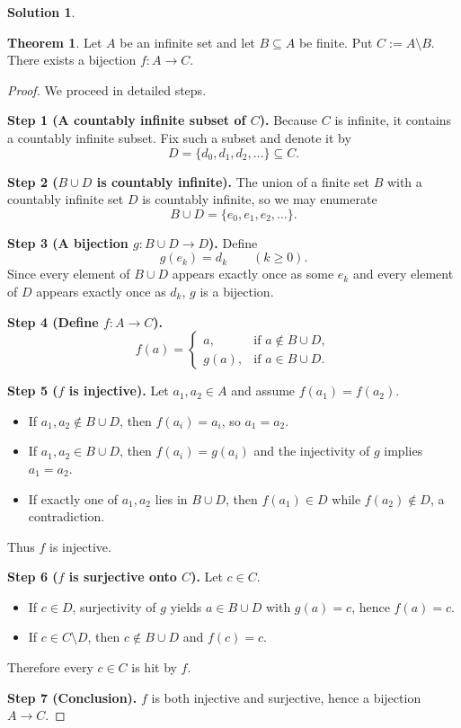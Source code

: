 \documentclass[12pt]{article}
\theoremstyle{definition} %
\newtheorem{solution}{Solution}
\newtheorem{theorem}{Theorem}
\theoremstyle{plain} %
\begin{document}
  \begin{solution}

    \begin{theorem}
      Let $A$ be an infinite set and let $B\subseteq A$ be finite.
      Put $C:=A\setminus B$.
      There exists a bijection $f\colon A\to C$.
      \end{theorem}
      
      \begin{proof}
      We proceed in detailed steps.
      
      \textbf{Step 1 (A countably infinite subset of $C$).}
      Because $C$ is infinite, it contains a countably infinite subset.
      Fix such a subset and denote it by
      \[
        D=\{d_0,d_1,d_2,\dots\}\subseteq C.
      \]
      
      \textbf{Step 2 ($B\cup D$ is countably infinite).}
      The union of a finite set $B$ with a countably infinite set $D$ is
      countably infinite, so we may enumerate
      \[
        B\cup D=\{e_0,e_1,e_2,\dots\}.
      \]
      
      \textbf{Step 3 (A bijection $g\colon B\cup D\to D$).}
      Define
      \[
        g(e_k)=d_k\qquad(k\ge 0).
      \]
      Since every element of $B\cup D$ appears exactly once as some $e_k$
      and every element of $D$ appears exactly once as $d_k$,
      $g$ is a bijection.
      
      \textbf{Step 4 (Define $f\colon A\to C$).}
      \[
        f(a)=
        \begin{cases}
          a,   &\text{if }a\notin B\cup D,\\[6pt]
          g(a),&\text{if }a\in B\cup D.
        \end{cases}
      \]
      
      \textbf{Step 5 ($f$ is injective).}
      Let $a_1,a_2\in A$ and assume $f(a_1)=f(a_2)$.
      \begin{itemize}
        \item If $a_1,a_2\notin B\cup D$, then $f(a_i)=a_i$, so $a_1=a_2$.
        \item If $a_1,a_2\in B\cup D$, then $f(a_i)=g(a_i)$ and the injectivity of $g$
              implies $a_1=a_2$.
        \item If exactly one of $a_1,a_2$ lies in $B\cup D$, then
              $f(a_1)\in D$ while $f(a_2)\notin D$, a contradiction.
      \end{itemize}
      Thus $f$ is injective.
      
      \textbf{Step 6 ($f$ is surjective onto $C$).}
      Let $c\in C$.
      \begin{itemize}
        \item If $c\in D$, surjectivity of $g$ yields $a\in B\cup D$ with $g(a)=c$,
              hence $f(a)=c$.
        \item If $c\in C\setminus D$, then $c\notin B\cup D$ and $f(c)=c$.
      \end{itemize}
      Therefore every $c\in C$ is hit by $f$.
      
      \textbf{Step 7 (Conclusion).}
      $f$ is both injective and surjective, hence a bijection $A\to C$.
      \end{proof}
    \end{solution}
\end{document}
